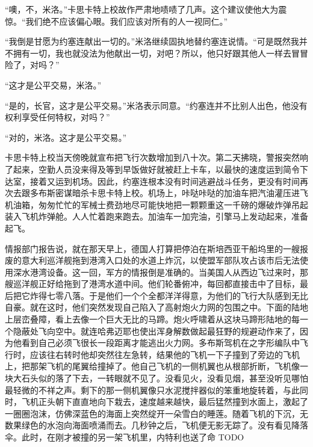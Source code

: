     “噢，不，米洛。”卡思卡特上校故作严肃地啧啧了几声。这个建议使他大为震惊。“我们绝不应该偏心眼。我们应该对所有的人一视同仁。”

    “我倒是甘愿为约塞连献出一切的。”米洛继续固执地替约塞连说情。“可是既然我并不拥有一切，我也就没法为他献出一切，对吧？所以，他只好跟其他人一样去冒冒险了，对吗？”

    “这才是公平交易，米洛。”

    “是的，长官，这才是公平交易。”米洛表示同意。“约塞连并不比别人出色，他没有权利享受任何特权，对吗？”

    “对的，米洛。这才是公平交易。”

    卡思卡特上校当天傍晚就宣布把飞行次数增加到八十次。第二天拂晓，警报突然响了起来，空勤人员没来得及等到早饭做好就被赶上卡车，以最快的速度运到简令下达室，接着又运到机场。因此，约塞连根本没有时间逃避战斗任务，更没有时间再次去跟多布斯密谋暗杀卡思卡特上校。机场上，咔哒咔哒的加油车把汽油灌压进飞机油箱，匆匆忙忙的军械士费劲地尽可能快地把一颗颗重这一千磅的爆破炸弹吊起装入飞机炸弹舱。人人忙着跑来跑去。加油车一加完油，引擎马上发动起来，准备起飞。

    情报部门报告说，就在那天早上，德国人打算把停泊在斯培西亚干船坞里的一艘报废的意大利巡洋舰拖到港湾入口处的水道上炸沉，以使盟军部队攻占该市后无法使用深水港湾设备。这一回，军方的情报倒是准确的。当美国人从西边飞过来时，那艘巡洋舰正好给拖到了港湾水道中间。他们轮番俯冲，每回都直接击中了目标，最后把它炸得七零八落。于是他们一个个全都洋洋得意，为他们的飞行大队感到无比自豪。就在这时，他们突然发现自己陷入了高射炮火力网的包围之中。下面的陆地上层峦叠障，看上去像一个巨大无比的马蹄。炮火呼啸着从这块马蹄形陆地的每一个隐蔽处飞向空中。就连哈弗迈耶也使出浑身解数做起最狂野的规避动作来了，因为他看到自己必须飞很长一段距离才能逃出火力网。多布斯驾机在之字形编队中飞行时，应该往右转时他却突然往左急转，结果他的飞机一下子撞到了旁边的飞机上，把那架飞机的尾翼给撞掉了。他自己飞机的一侧机翼也从根部折断，飞机像一块大石头似的落了下去，一转眼就不见了。没看见火，没看见烟，甚至没听见哪怕最轻微的不祥之声。剩下的那一侧机翼像只水泥搅拌器似的笨重地旋转着，与此同时，飞机正头朝下直直地向下栽去，速度越来越快，最后猛然撞到水面上，激起了一圈圈泡沫，仿佛深蓝色的海面上突然绽开一朵雪白的睡莲。随着飞机的下沉，无数果绿色的水泡向海面喷涌而去。几秒钟之后，飞机便无影无踪了。没有看见降落伞。此时，在刚才被撞的另一架飞机里，内特利也送了命
TODO
